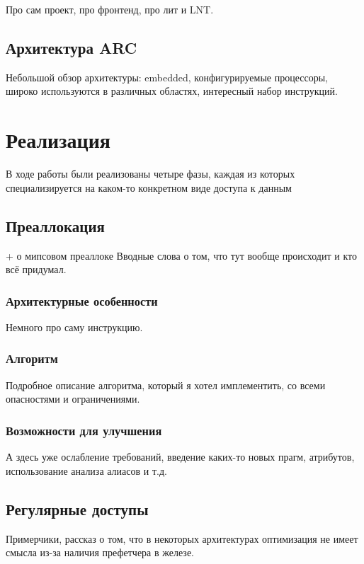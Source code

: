 \documentclass[12pt,a4paper]{article}
\begin{document}
Про сам проект, про фронтенд, про лит и LNT.

\subsection{Архитектура ARC}

Небольшой обзор архитектуры: embedded, конфигурируемые процессоры, широко используются в различных областях, интересный набор инструкций.

\section{Реализация}

В ходе работы были реализованы четыре фазы, каждая из которых специализируется на каком-то конкретном виде доступа к данным

\subsection{Преаллокация}

+ о мипсовом преаллоке
Вводные слова о том, что тут вообще происходит и кто всё придумал.

\subsubsection{Архитектурные особенности}

Немного про саму инструкцию.

\subsubsection{Алгоритм}

Подробное описание алгоритма, который я хотел имплементить, со всеми опасностями и ограничениями.

\subsubsection{Возможности для улучшения}

А здесь уже ослабление требований, введение каких-то новых прагм, атрибутов, использование анализа алиасов и т.д.

\subsection{Регулярные доступы}

Примерчики, рассказ о том, что в некоторых архитектурах оптимизация не имеет смысла из-за наличия префетчера в железе.
\end{document}
